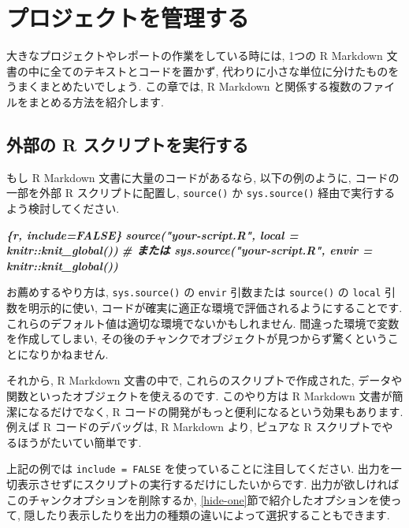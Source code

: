 \documentclass[
  11pt,
  lualatex,ja=standard,jafont=noto]{bxjsreport}
\newenvironment{Shaded}{\begin{snugshade}}{\end{snugshade}}
\newcommand{\InformationTok}[1]{\textcolor[rgb]{0.56,0.35,0.01}{\textbf{\textit{#1}}}}
\begin{document}
\hypertarget{managing-projects}{%
\chapter{プロジェクトを管理する}\label{managing-projects}}

大きなプロジェクトやレポートの作業をしている時には, 1つの R Markdown 文書の中に全てのテキストとコードを置かず, 代わりに小さな単位に分けたものをうまくまとめたいでしょう. この章では, R Markdown と関係する複数のファイルをまとめる方法を紹介します.

\hypertarget{source-script}{%
\section{外部の R スクリプトを実行する}\label{source-script}}

もし R Markdown 文書に大量のコードがあるなら, 以下の例のように, コードの一部を外部 R スクリプトに配置し, \texttt{source()} か \texttt{sys.source()} 経由で実行するよう検討してください.

\begin{Shaded}
\begin{Highlighting}[]
\InformationTok{\textasciigrave{}\textasciigrave{}\textasciigrave{}\{r, include=FALSE\}}
\InformationTok{source("your{-}script.R", local = knitr::knit\_global())}
\InformationTok{\# または sys.source("your{-}script.R", envir = knitr::knit\_global())}
\InformationTok{\textasciigrave{}\textasciigrave{}\textasciigrave{}}
\end{Highlighting}
\end{Shaded}

お薦めするやり方は, \texttt{sys.source()} の \texttt{envir} 引数または \texttt{source()} の \texttt{local} 引数を明示的に使い, コードが確実に適正な環境で評価されるようにすることです. これらのデフォルト値は適切な環境でないかもしれません. 間違った環境で変数を作成してしまい, その後のチャンクでオブジェクトが見つからず驚くということになりかねません.

それから, R Markdown 文書の中で, これらのスクリプトで作成された, データや関数といったオブジェクトを使えるのです. このやり方は R Markdown 文書が簡潔になるだけでなく, R コードの開発がもっと便利になるという効果もあります. 例えば R コードのデバッグは, R Markdown より, ピュアな R スクリプトでやるほうがたいてい簡単です.

上記の例では \texttt{include = FALSE} を使っていることに注目してください. 出力を一切表示させずにスクリプトの実行するだけにしたいからです. 出力が欲しければこのチャンクオプションを削除するか, \ref{hide-one}節で紹介したオプションを使って, 隠したり表示したりを出力の種類の違いによって選択することもできます.
\end{document}
